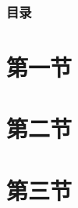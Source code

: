 \documentclass{ctexbeamer}
\begin{document}
    \begin{frame}
        \frametitle{目录}
        \tableofcontents[hideallsubsections]
    \end{frame}

    \section{第一节}
    \section{第二节}
    \section{第三节}
    \begin{frame}[plain]
        \sectionpage
    \end{frame}
\end{document}
